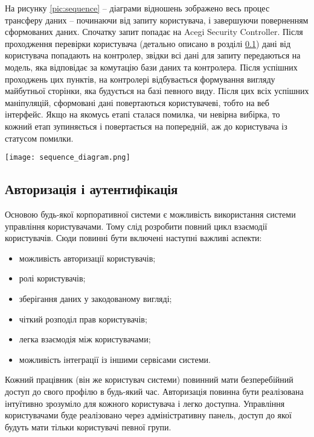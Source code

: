 \par На рисунку \ref{pic:sequence} -- діаграми відношень зображено весь процес трансферу даних -- починаючи від запиту користувача, і завершуючи поверненням сформованих даних. Спочатку запит попадає на Acegi Security Controller. Після проходження перевірки користувача (детально описано в розділі \ref{sec:authority}) дані від користувача попадають на контролер, звідки всі дані для запиту передаються на модель, яка відповідає за комутацію бази даних та контролера. Після успішних проходжень цих пунктів, на контролері відбувається формування вигляду майбутньої сторінки, яка будується на базі певного виду. Після цих всіх успішних маніпуляцій, сформовані дані повертаються користувачеві, тобто на веб інтерфейс. Якщо на якомусь етапі сталася помилка, чи невірна вибірка, то кожний етап зупиняється і повертається на попередній, аж до користувача із статусом помилки.

\begin{center}
		\texttt{[image: sequence\_diagram.png]}
		\vspace{18pt}
		\label{pic:sequence}
\end{center}

\subsection{Авторизація і аутентифікація}\label{sec:authority}
Основою будь-якої корпоративної системи є можливість використання системи управління користувачами.
Тому слід розробити повний цикл взаємодії користувачів. Сюди повинні бути включені наступні важливі аспекти:
\begin{itemize}
	\item можливість авторизації користувачів;
	\item ролі користувачів;
	\item зберігання даних у закодованому вигляді;
	\item чіткий розподіл прав користувачів;
	\item легка взаємодія між користувачами;
	\item можливість інтеграції із іншими сервісами системи.
\end{itemize}

\par Кожний працівник (він же користувач системи) повинний мати безперебійний доступ до свого профілю в будь-який час.
Авторизація повинна бути реалізована інтуїтивно зрозуміло для кожного користувача і легко доступна.
Управління користувачами буде реалізовано через адміністративну панель, доступ до якої будуть мати тільки користувачі певної групи.

